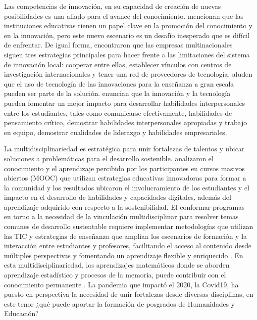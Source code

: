 \documentclass{textolivre}
\begin{document}
Las competencias de innovación, en su capacidad de creación de nuevas posibilidades es una aliado para el avance del conocimiento. \textcite{picatoste_new_2018} mencionan que las instituciones educativas tienen un papel clave en la promoción del conocimiento y en la innovación, pero este nuevo escenario es un desafío inesperado que es difícil de enfrentar. De igual forma, \textcite{aboal_knowledge_2018} encontraron que las empresas multinacionales siguen tres estrategias principales para hacer frente a las limitaciones del sistema de innovación local: cooperar entre ellas, establecer vínculos con centros de investigación internacionales y tener una red de proveedores de tecnología. \textcite{sanchez-gordon_technological_2018} aluden que el uso de tecnología de las innovaciones para la enseñanza a gran escala pueden ser parte de la solución. \textcite{ibrahim_innovation_2018} enuncian que la innovación y la tecnología pueden fomentar un mejor impacto para desarrollar habilidades interpersonales entre los estudiantes, tales como comunicarse efectivamente, habilidades de pensamiento crítico, demostrar habilidades interpersonales apropiadas y trabajo en equipo, demostrar cualidades de liderazgo y habilidades empresariales.

La multidisciplinariedad es estratégica para unir fortalezas de talentos y ubicar soluciones a problemáticas para el desarrollo sostenible. \textcite{carrera_innovative_2018} analizaron el conocimiento y el aprendizaje percibido por los participantes en cursos masivos abiertos (MOOC) que utilizan estrategias educativas innovadoras para formar a la comunidad y los resultados ubicaron el involucramiento de los estudiantes y el impacto en el desarrollo de habilidades y capacidades digitales, además del aprendizaje adquirido con respecto a la sostenibilidad. El conformar programas en torno a la necesidad de la vinculación multidisciplinar para resolver temas comunes de desarrollo sustentable requiere implementar metodologías que utilizan las TIC y estrategias de enseñanza que amplían los escenarios de formación y la interacción entre estudiantes y profesores, facilitando el acceso al contenido desde múltiples perspectivas y fomentando un aprendizaje flexible y enriquecido \cite{ramirez-montoya_characterization_2021}. En esta multidisciplinariedad, los aprendizajes matemáticos donde se aborden aprendizaje estadístico y procesos de la memoria, puede contribuir con el conocimiento permanente \cite{gomez_infants_2017}. La pandemia que impactó el 2020, la Covid19, ha puesto en perspectiva la necesidad de unir fortalezas desde diversas disciplinas, en este tenor ¿qué puede aportar la formación de posgrados de Humanidades y Educación?
\end{document}
